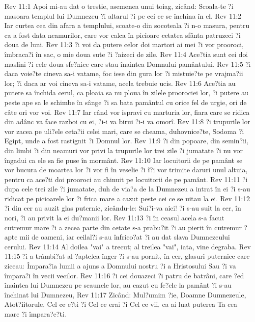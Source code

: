 Rev 11:1  Apoi mi-au dat o trestie, asemenea unui toiag, zicând: Scoala-te ?i masoara templul lui Dumnezeu ?i altarul ?i pe cei ce se închina în el.
Rev 11:2  Iar curtea cea din afara a templului, scoate-o din socoteala ?i n-o masura, pentru ca a fost data neamurilor, care vor calca în picioare cetatea sfânta patruzeci ?i doua de luni.
Rev 11:3  ?i voi da putere celor doi martori ai mei ?i vor prooroci, îmbraca?i în sac, o mie doua sute ?i ?aizeci de zile.
Rev 11:4  Ace?tia sunt cei doi maslini ?i cele doua sfe?nice care stau înaintea Domnului pamântului.
Rev 11:5  ?i daca voie?te cineva sa-i vatame, foc iese din gura lor ?i mistuie?te pe vrajma?ii lor; ?i daca ar voi cineva sa-i vatame, acela trebuie ucis.
Rev 11:6  Ace?tia au putere sa închida cerul, ca ploaia sa nu ploua în zilele proorociei lor, ?i putere au peste ape sa le schimbe în sânge ?i sa bata pamântul cu orice fel de urgie, ori de câte ori vor voi.
Rev 11:7  Iar când vor ispravi cu marturia lor, fiara care se ridica din adânc va face razboi cu ei, ?i-i va birui ?i-i va omorî.
Rev 11:8  ?i trupurile lor vor zacea pe uli?ele ceta?ii celei mari, care se cheama, duhovnice?te, Sodoma ?i Egipt, unde a fost rastignit ?i Domnul lor.
Rev 11:9  ?i din popoare, din semin?ii, din limbi ?i din neamuri vor privi la trupurile lor trei zile ?i jumatate ?i nu vor îngadui ca ele sa fie puse în mormânt.
Rev 11:10  Iar locuitorii de pe pamânt se vor bucura de moartea lor ?i vor fi în veselie ?i î?i vor trimite daruri unul altuia, pentru ca ace?ti doi prooroci au chinuit pe locuitorii de pe pamânt.
Rev 11:11  ?i dupa cele trei zile ?i jumatate, duh de via?a de la Dumnezeu a intrat în ei ?i s-au ridicat pe picioarele lor ?i frica mare a cazut peste cei ce se uitau la ei.
Rev 11:12  ?i din cer au auzit glas puternic, zicându-le: Sui?i-va aici! ?i s-au suit la cer, în nori, ?i au privit la ei du?manii lor.
Rev 11:13  ?i în ceasul acela s-a facut cutremur mare ?i a zecea parte din cetate s-a prabu?it ?i au pierit în cutremur ?apte mii de oameni, iar ceilal?i s-au înfrico?at ?i au dat slava Dumnezeului cerului.
Rev 11:14  Al doilea "vai" a trecut; al treilea "vai", iata, vine degraba.
Rev 11:15  ?i a trâmbi?at al ?aptelea înger ?i s-au pornit, în cer, glasuri puternice care ziceau: Împara?ia lumii a ajuns a Domnului nostru ?i a Hristosului Sau ?i va împara?i în vecii vecilor.
Rev 11:16  ?i cei douazeci ?i patru de batrâni, care ?ed înaintea lui Dumnezeu pe scaunele lor, au cazut cu fe?ele la pamânt ?i s-au închinat lui Dumnezeu,
Rev 11:17  Zicând: Mul?umim ?ie, Doamne Dumnezeule, Atot?iitorule, Cel ce e?ti ?i Cel ce erai ?i Cel ce vii, ca ai luat puterea Ta cea mare ?i împara?e?ti.
